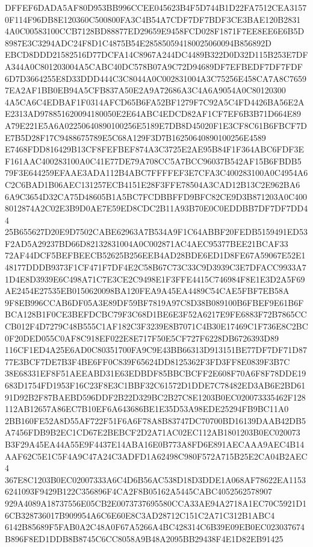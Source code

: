 \documentclass[UTF8,fontset=fandol,zihao=-4,a4paper]{ctexart}
\begin{document}
{{DFFEF6DADA5AF80D953BB996CCEE045623B4F5D744B1D22FA7512CEA31570F114F96DB8E120360C500800FA3C4B54A7CDF7DF7BDF3CE3BAE120B2831
4A0C00583100CCB7128BD88877ED29659E9458FCD028F1871F7EE8EE6E6B5D8987E3C3294ADC24F8D1C4875B54E285850594180025060094B856892D
EBCD8DDD21582516D77DCFA14C8967A244DC4489B322D0D32D115B253E7DFA344A0C801203004A5CABC40DC578B07A9C72D94689DF7EFBEDF7DF7FDF
6D7D3664255E8D33DDD444C3C8044A0C002831004A3C75256E458CA7A8C76597EA2AF1BB0EB94A5CFB837A50E2A9A72686A3C4A6A9054A0C80120300
4A5CA6C4EDBAF1F0314AFCD65B6FA52BF1279F7C92A5C4FD4426BA56E2AE2313AD978851620094180050E2E64ABC4EDCD82AF1CF7EF6B3B71D664E89
A79E221E5A6A02250640890100256E5189E7DB8D45020F1E3CF8C61B6FBCF7DE7B5D28F17C9488675789E5C68A129F3D7B16250640890100256E4589
E7468FDD816429B13CF8FEFBEF874A3C3725E2AE95B84F1F364ABC6FDF3EF161AAC400283100A0C41E77DE79A708CC5A7BCC96037B542AF15B6FBDB5
79F3E644259EFAAE3ADA112B4ABC7FFFFEF3E7CFA3C400283100A0C4954A6C2C6BAD1B06AEC131257ECB4151E28F3FFE78504A3CAD12B13C2E962BA6
6A9C3654D32CA75D48605B1A5BC7FCDBBFFD9BFC82CE9D3B871203A0C4008012874A2C02E3B9D0AE7E59ED8CDC2B11A93B70E0C0EDDBB7DF7DF7DD44
25B655627D20E9D7502CABE62963A7B534A9F1C64ABBF20FEDB5159491ED53F2AD5A29237BD66D82132831004A0C002871AC4AEC95377BEE21BCAF33
72AF44DCF5BEFBEECB52625B256EEB4AD28BDE6ED1D8FE67A59067E52E148177DDDB9373F1CF471F7DF4E2C58B67C73C33C9D3939C3E7DFACC9933A7
1D4E8D3939E6C498A71C7E3CE2C9498E1F3FFE4415C746984F8E1E3D2A5F69AE2454E27535EB0150620098BA120FEA9A45EA4489C54CAE5FBF7EB58A
9F8EB996CCAB6DF05A3E89DF59BF7819A97C8D38B089100B6FBEF9E61B6FBCA128B1F0CE3BEFDCBC79F3C68D1BE6E3F52A6217E9FE6883F72B7865CC
CB012F4D7279C48B555C1AF182C3F3239E8B7071C4B30E17469C1F736E8C2BC0F20DED055C0AF8C918EF022E8E717F50E5CF727F6228DB6726393D89
116CF1ED4A25E6AD0C80351700FA9C9E43BB66313D913151BE77DF7DF71D8777E3BCF7DE7B3F4BE6FF0C839F65624DD8125362F3FD3FF8E0839F3B7C
38E68331EF8F51AEEABD31E63EDBDF85BBCBCFF2E608F70A6F8F78DDE19683D1754FD1953F16C23F8E3C1BBF32C61572D1DDE7C78482ED3AB6E2BD61
91D92B2F87BAEBD596DDF2B22D329BC2B27C8E1203B0EC020073335462F128112AB12657A86EC7B10EF6A643686BE1E35D53A98EDE25294FB9BC11A0
2BB160FE52A8D55AF722F51F6A6F78A8B83747DC70700BD16139DAAB42DB5A7456FDB9B2EC1CD67E2BEBCF2D2A71AC02EC112AB1801203B0EC020073
B3F29A45EA44A55E9F4437E14ABA16E0B773A8FD6E891AECAAA9AEC4B14AAF62C5E1C5F4A9C47A24C3ADFD1A62498C980F572A715B25E2CA04B2AEC4
367E8C1203B0EC02007333A6C4D6B56AC538D18D3DDE1A068AF78622EA11536241093F9429B122C356896F4CA2F8B05162A5445CABC4052562578907
929A4089A18737556E05CB2E0073737695580CCA33AE94A2718A1EC70C5921D16CB328736017B909954A6C6E60E8C3AD28712C151C2A71C312B1ABC4
6142B85689F5FAB0A2C48A0F67A5266A4BC428314C6B39E09EB0EC023037674B896F8ED1DDB8B8745C6CC8058A9B48A2095BB29438F4E1D82EB91425
}}
\end{document}
